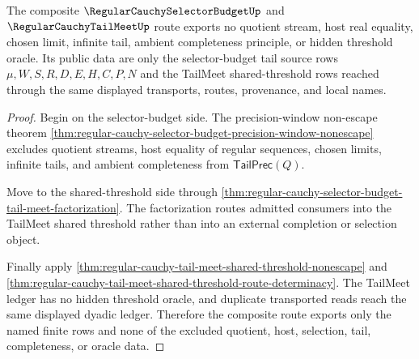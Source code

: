 \begin{theorem}
\label{thm:regular-cauchy-selector-budget-tail-meet-nonescape}
The composite $\RegularCauchySelectorBudgetUp$ and $\RegularCauchyTailMeetUp$ route exports no quotient stream, host real equality, chosen limit, infinite tail, ambient completeness principle, or hidden threshold oracle. Its public data are only the selector-budget tail source rows $\mu,W,S,R,D,E,H,C,P,N$ and the TailMeet shared-threshold rows reached through the same displayed transports, routes, provenance, and local names.
\end{theorem}
\begin{proof}
Begin on the selector-budget side. The precision-window non-escape theorem \autoref{thm:regular-cauchy-selector-budget-precision-window-nonescape} excludes quotient streams, host equality of regular sequences, chosen limits, infinite tails, and ambient completeness from $\mathsf{TailPrec}(Q)$.

Move to the shared-threshold side through \autoref{thm:regular-cauchy-selector-budget-tail-meet-factorization}. The factorization routes admitted consumers into the TailMeet shared threshold rather than into an external completion or selection object.

Finally apply \autoref{thm:regular-cauchy-tail-meet-shared-threshold-nonescape} and \autoref{thm:regular-cauchy-tail-meet-shared-threshold-route-determinacy}. The TailMeet ledger has no hidden threshold oracle, and duplicate transported reads reach the same displayed dyadic ledger. Therefore the composite route exports only the named finite rows and none of the excluded quotient, host, selection, tail, completeness, or oracle data.
\end{proof}

